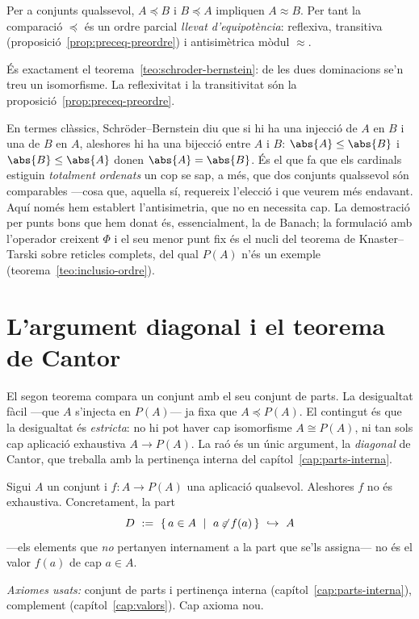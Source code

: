 \begin{corollari}\label{cor:preceq-antisimetric}
Per a conjunts qualssevol, \(A\preceq B\) i \(B\preceq A\) impliquen
\(A\approx B\). Per tant la comparació \(\preceq\) és un ordre parcial
\emph{llevat d'equipotència}: reflexiva, transitiva
(proposició~\ref{prop:preceq-preordre}) i antisimètrica mòdul \(\approx\).
\end{corollari}

\begin{prova}
És exactament el teorema~\ref{teo:schroder-bernstein}: de les dues
dominacions se'n treu un isomorfisme. La reflexivitat i la transitivitat són
la proposició~\ref{prop:preceq-preordre}.
\end{prova}

\begin{observacio}\label{obs:sb-classica}
En termes clàssics, Schröder--Bernstein diu que si hi ha una injecció de
\(A\) en \(B\) i una de \(B\) en \(A\), aleshores hi ha una bijecció entre
\(A\) i \(B\): \(\abs{A}\le\abs{B}\) i \(\abs{B}\le\abs{A}\) donen
\(\abs{A}=\abs{B}\). És el que fa que els cardinals estiguin \emph{totalment
ordenats} un cop se sap, a més, que dos conjunts qualssevol són comparables
---cosa que, aquella sí, requereix l'elecció i que veurem més endavant. Aquí
només hem establert l'antisimetria, que no en necessita cap. La demostració
per punts bons que hem donat és, essencialment, la de Banach; la formulació
amb l'operador creixent \(\Phi\) i el seu menor punt fix és el nucli del
teorema de Knaster--Tarski sobre reticles complets, del qual \(P(A)\) n'és un
exemple (teorema~\ref{teo:inclusio-ordre}).
\end{observacio}

\section{L'argument diagonal i el teorema de Cantor}\label{sec:cantor}

El segon teorema compara un conjunt amb el seu conjunt de parts. La
desigualtat fàcil ---que \(A\) s'injecta en \(P(A)\)--- ja fixa que
\(A\preceq P(A)\). El contingut és que la desigualtat és \emph{estricta}: no
hi pot haver cap isomorfisme \(A\cong P(A)\), ni tan sols cap aplicació
exhaustiva \(A\to P(A)\). La raó és un únic argument, la
\emph{diagonal} de Cantor, que treballa amb la pertinença interna del
capítol~\ref{cap:parts-interna}.

\begin{teorema}\label{teo:diagonal}
Sigui \(A\) un conjunt i \(f\colon A\to P(A)\) una aplicació qualsevol.
Aleshores \(f\) no és exhaustiva. Concretament, la part
\[
D\ :=\ \{\,a\in A\ \mid\ a\not\mathrel{\varepsilon} f(a)\,\}\ \hookrightarrow\ A
\]
---els elements que \emph{no} pertanyen internament a la part que se'ls
assigna--- no és el valor \(f(a)\) de cap \(a\in A\).\par
\emph{Axiomes usats:} conjunt de parts i pertinença interna
(capítol~\ref{cap:parts-interna}), complement (capítol~\ref{cap:valors}).
Cap axioma nou.
\end{teorema}

